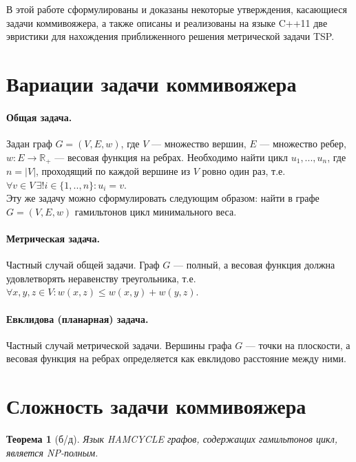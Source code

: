 \documentclass[a4paper]{article}
\newtheorem{theorem}{Теорема}
\begin{document}
В этой работе сформулированы и доказаны некоторые утверждения, касающиеся задачи коммивояжера, а также описаны и реализованы на языке C++11 две эвристики для нахождения приближенного решения метрической задачи TSP.

\bigskip

\section{Вариации задачи коммивояжера}
\paragraph{Общая задача.}
Задан граф $G=(V, E, w)$, где $V$ --- множество вершин, $E$ --- множество ребер, $w: E\rightarrow\mathbb{R}_+$ --- весовая функция на ребрах. Необходимо найти цикл $u_1,...,u_n$, где $n=|V|$, проходящий по каждой вершине из $V$ ровно один раз, т.е. $\forall v\in V\, \exists! i\in \{1,..,n\}: u_i = v$.\\Эту же задачу можно сформулировать следующим образом: найти в графе $G=(V,E, w)$ гамильтонов цикл минимального веса.
\paragraph{Метрическая задача.}
Частный случай общей задачи. Граф $G$ --- полный, а весовая функция должна удовлетворять неравенству треугольника, т.е. $\forall x,y,z\in V: w(x,z) \le w(x,y)+w(y,z)$.
\paragraph{Евклидова (планарная) задача.}
Частный случай метрической задачи. Вершины графа $G$ --- точки на плоскости, а весовая функция на ребрах определяется как евклидово расстояние между ними. \cite{wikiru}

\bigskip

\section{Сложность задачи коммивояжера}
\begin{theorem}[б/д]
    Язык HAMCYCLE графов, содержащих гамильтонов цикл, является NP-полным. \cite{arora}
\end{theorem}
\end{document}
